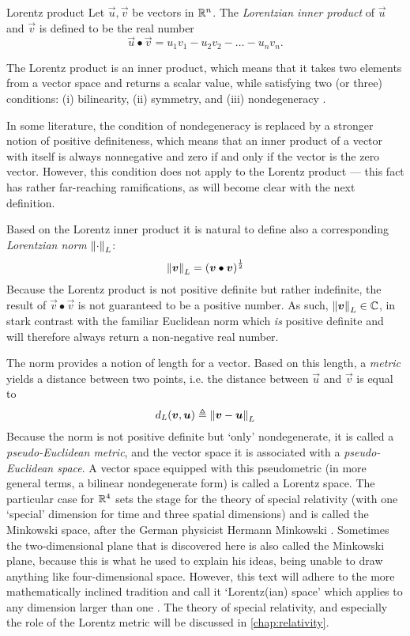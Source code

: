 \begin{thmblock}{Lorentz product}
    Let \(\vec{u}, \vec{v}\) be vectors in \(\mathbb{R}^n\). The \emph{Lorentzian inner product} of \(\vec{u}\) and \(\vec{v}\) is defined to be the real number
    \[
     \vec{u} \bullet \vec{v} = u_1v_1 - u_2v_2 - \ldots - u_nv_n.
\]
\end{thmblock}
The Lorentz product is an inner product, which means that it takes two elements from a vector space and returns a scalar value, while satisfying two (or three) conditions: (i) bilinearity, (ii) symmetry, and (iii) nondegeneracy \cite{Ratcliffe2019}.

In some literature, the condition of nondegeneracy is replaced by a stronger notion of positive definiteness, which means that an inner product of a vector with itself is always nonnegative and zero if and only if the vector is the zero vector. However, this condition does not apply to the Lorentz product --- this fact has rather far-reaching ramifications, as will become clear with the next definition. 

Based on the Lorentz inner product it is natural to define also a corresponding \emph{Lorentzian norm} \(\norm{\cdot}_L\):
    \[
     \norm{\vb*{v}}_L = \qty(\vb*{v}\bullet\vb*{v})^\frac{1}{2}
\]
Because the Lorentz product is not positive definite but rather indefinite, the result of \(\vec{v}\bullet\vec{v}\) is not guaranteed to be a positive number. As such, \(\norm{\vb*{v}}_L \in \mathbb{C}\), in stark contrast with the familiar Euclidean norm which \emph{is} positive definite and will therefore always return a non-negative real number.

The norm provides a notion of length for a vector. Based on this length, a \emph{metric} yields a distance between two points, i.e. the distance between \(\vec{u}\) and \(\vec{v}\) is equal to 
\[
     d_L(\vb*{v}, \vb*{u}) \triangleq \norm{\vb*{v} - \vb*{u}}_L
\] 
Because the norm is not positive definite but `only' nondegenerate, it is called a \emph{pseudo-Euclidean metric}, and the vector space it is associated with a \emph{pseudo-Euclidean space}. A vector space equipped with this pseudometric (in more general terms, a bilinear nondegenerate form) is called a Lorentz space. The particular case for \(\mathbb{R}^4\) sets the stage for the theory of special relativity (with one `special' dimension for time and three spatial dimensions) and is called the Minkowski space, after the German physicist Hermann Minkowski \cite{Catoni2008}. Sometimes the two-dimensional plane that is discovered here is also called the Minkowski plane, because this is what he used to explain his ideas, being unable to draw anything like four-dimensional space. However, this text will adhere to the more mathematically inclined tradition and call it `Lorentz(ian) space' which applies to any dimension larger than one \cite{Ratcliffe2019}. The theory of special relativity, and especially the role of the Lorentz metric will be discussed in \cref{chap:relativity}.

